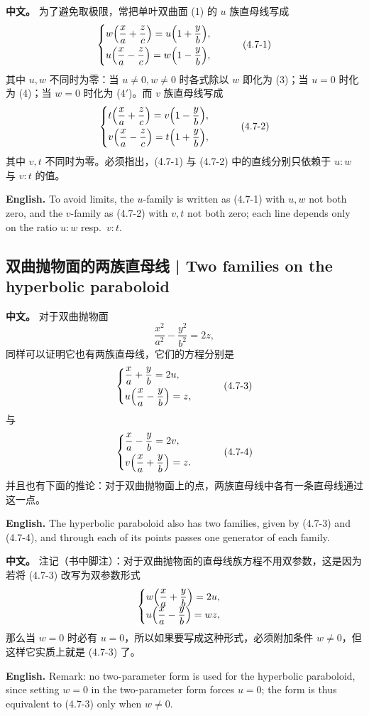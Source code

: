 \documentclass[UTF8,11pt,a4paper]{ctexart}
\newcommand{\APS}[2]{\par\noindent\textbf{中文。} #1\par\noindent\textbf{English.} #2\par\smallskip}
\theoremstyle{definition}
\begin{document}
\APS{为了避免取极限，常把单叶双曲面 (1) 的 $u$ 族直母线写成
\[
\begin{cases}w\Bigl(\dfrac{x}{a}+\dfrac{z}{c}\Bigr)=u\Bigl(1+\dfrac{y}{b}\Bigr),\\[6pt] u\Bigl(\dfrac{x}{a}-\dfrac{z}{c}\Bigr)=w\Bigl(1-\dfrac{y}{b}\Bigr),\end{cases}\tag{4.7-1}
\]
其中 $u,w$ 不同时为零：当 $u\ne0,w\ne0$ 时各式除以 $w$ 即化为 (3)；当 $u=0$ 时化为 (4)；当 $w=0$ 时化为 (4$'$)。而 $v$ 族直母线写成
\[
\begin{cases}t\Bigl(\dfrac{x}{a}+\dfrac{z}{c}\Bigr)=v\Bigl(1-\dfrac{y}{b}\Bigr),\\[6pt] v\Bigl(\dfrac{x}{a}-\dfrac{z}{c}\Bigr)=t\Bigl(1+\dfrac{y}{b}\Bigr),\end{cases}\tag{4.7-2}
\]
其中 $v,t$ 不同时为零。必须指出，(4.7-1) 与 (4.7-2) 中的直线分别只依赖于 $u:w$ 与 $v:t$ 的值。}{To avoid limits, the $u$-family is written as (4.7-1) with $u,w$ not both zero, and the $v$-family as (4.7-2) with $v,t$ not both zero; each line depends only on the ratio $u:w$ resp.\ $v:t$.}

\subsection{双曲抛物面的两族直母线 | Two families on the hyperbolic paraboloid}
\APS{对于双曲抛物面
\[
\frac{x^2}{a^2}-\frac{y^2}{b^2}=2z,
\]
同样可以证明它也有两族直母线，它们的方程分别是
\[
\begin{cases}\dfrac{x}{a}+\dfrac{y}{b}=2u,\\[6pt] u\Bigl(\dfrac{x}{a}-\dfrac{y}{b}\Bigr)=z,\end{cases}\tag{4.7-3}
\]
与
\[
\begin{cases}\dfrac{x}{a}-\dfrac{y}{b}=2v,\\[6pt] v\Bigl(\dfrac{x}{a}+\dfrac{y}{b}\Bigr)=z.\end{cases}\tag{4.7-4}
\]
并且也有下面的推论：对于双曲抛物面上的点，两族直母线中各有一条直母线通过这一点。}{The hyperbolic paraboloid also has two families, given by (4.7-3) and (4.7-4), and through each of its points passes one generator of each family.}

\APS{注记（书中脚注）：对于双曲抛物面的直母线族方程不用双参数，这是因为若将 (4.7-3) 改写为双参数形式
\[
\begin{cases}w\Bigl(\dfrac{x}{a}+\dfrac{y}{b}\Bigr)=2u,\\ u\Bigl(\dfrac{x}{a}-\dfrac{y}{b}\Bigr)=wz,\end{cases}
\]
那么当 $w=0$ 时必有 $u=0$，所以如果要写成这种形式，必须附加条件 $w\ne0$，但这样它实质上就是 (4.7-3) 了。}{Remark: no two-parameter form is used for the hyperbolic paraboloid, since setting $w=0$ in the two-parameter form forces $u=0$; the form is thus equivalent to (4.7-3) only when $w\ne0$.}
\end{document}

